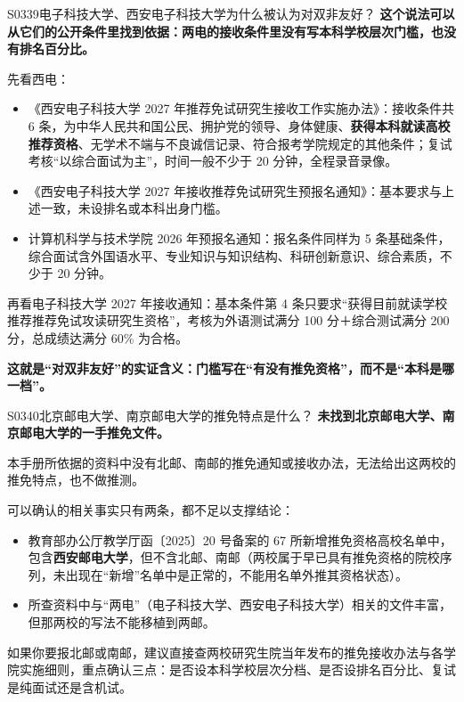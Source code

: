 \begin{qa}{S0339}{电子科技大学、西安电子科技大学为什么被认为对双非友好？}
\textbf{这个说法可以从它们的公开条件里找到依据：两电的接收条件里没有写本科学校层次门槛，也没有排名百分比。}

先看西电：

\begin{itemize}
  \item 《西安电子科技大学 2027 年推荐免试研究生接收工作实施办法》：接收条件共 6 条，为中华人民共和国公民、拥护党的领导、身体健康、\textbf{获得本科就读高校推荐资格}、无学术不端与不良诚信记录、符合报考学院规定的其他条件；复试考核“以综合面试为主”，时间一般不少于 20 分钟，全程录音录像。
  \item 《西安电子科技大学 2027 年接收推荐免试研究生预报名通知》：基本要求与上述一致，未设排名或本科出身门槛。
  \item 计算机科学与技术学院 2026 年预报名通知：报名条件同样为 5 条基础条件，综合面试含外国语水平、专业知识与知识结构、科研创新意识、综合素质，不少于 20 分钟。
\end{itemize}

再看电子科技大学 2027 年接收通知：基本条件第 4 条只要求“获得目前就读学校推荐推荐免试攻读研究生资格”，考核为外语测试满分 100 分＋综合测试满分 200 分，总成绩达满分 60\% 为合格。

\textbf{这就是“对双非友好”的实证含义：门槛写在“有没有推免资格”，而不是“本科是哪一档”。}
\end{qa}

\begin{qa}{S0340}{北京邮电大学、南京邮电大学的推免特点是什么？}
\textbf{未找到北京邮电大学、南京邮电大学的一手推免文件。}

本手册所依据的资料中没有北邮、南邮的推免通知或接收办法，无法给出这两校的推免特点，也不做推测。

可以确认的相关事实只有两条，都不足以支撑结论：

\begin{itemize}
  \item 教育部办公厅教学厅函〔2025〕20 号备案的 67 所新增推免资格高校名单中，包含\textbf{西安邮电大学}，但不含北邮、南邮（两校属于早已具有推免资格的院校序列，未出现在“新增”名单中是正常的，不能用名单外推其资格状态）。
  \item 所查资料中与“两电”（电子科技大学、西安电子科技大学）相关的文件丰富，但那两校的写法不能移植到两邮。
\end{itemize}

如果你要报北邮或南邮，建议直接查两校研究生院当年发布的推免接收办法与各学院实施细则，重点确认三点：是否设本科学校层次分档、是否设排名百分比、复试是纯面试还是含机试。
\end{qa}

